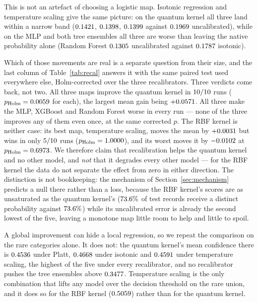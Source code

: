 \documentclass[journal]{IEEEtran}
\begin{document}
This is not an artefact of choosing a logistic map. Isotonic regression and
temperature scaling give the same picture: on the quantum kernel all three
land within a narrow band ($0.1421$, $0.1398$,
$0.1399$ against $0.1969$ uncalibrated), while on the MLP and
both tree ensembles all three are worse than leaving the native probability
alone (Random Forest $0.1305$ uncalibrated against $0.1787$
isotonic).

Which of those movements are real is a separate question from their size,
and the last column of Table~\ref{tab:recal} answers it with the same
paired test used everywhere else, Holm-corrected over the three
recalibrators. Three verdicts come back, not two. All three maps improve
the quantum kernel in $10/10$ runs
($p_{\text{Holm}}=0.0059$ for each), the largest mean gain
being $+0.0571$. All three make the MLP, XGBoost and Random Forest
worse in every run --- none of the three improves any of them even once, at
the same corrected $p$. The RBF kernel is neither case: its best map,
temperature scaling, moves the mean by $+0.0031$ but wins in only
$5/10$ runs ($p_{\text{Holm}}=1.0000$), and its
worst moves it by $-0.0102$ at
$p_{\text{Holm}}=0.6973$. We therefore claim that
recalibration helps the quantum kernel and no other model, and \emph{not}
that it degrades every other model --- for the RBF kernel the data do not
separate the effect from zero in either direction. The distinction is not
bookkeeping: the mechanism of Section~\ref{sec:mechanism} predicts a null
there rather than a loss, because the RBF kernel's scores are as
unsaturated as the quantum kernel's ($73.6\%$ of test records
receive a distinct probability against $73.6\%$) while its
uncalibrated error is already the second lowest of the five, leaving a
monotone map little room to help and little to spoil.

A global improvement can hide a local regression, so we repeat the
comparison on the rare categories alone. It does not: the quantum kernel's
mean confidence there is $0.4536$ under Platt,
$0.4668$ under isotonic and $0.4591$ under temperature
scaling, the highest of the five under every recalibrator, and no
recalibrator pushes the tree ensembles above $0.3477$. Temperature
scaling is the only combination that lifts any model over the decision
threshold on the rare union, and it does so for the RBF kernel
($0.5059$) rather than for the quantum kernel.
\end{document}
